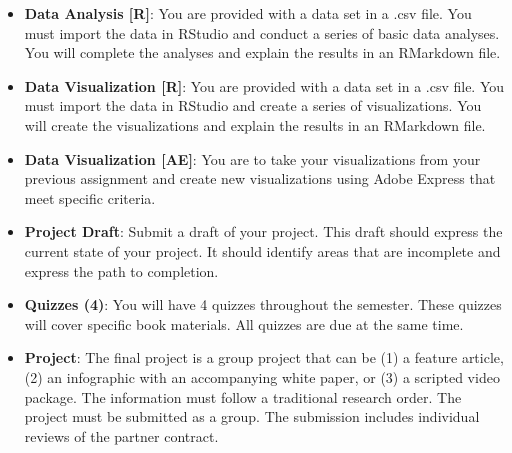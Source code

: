 \documentclass[
]{book}
\begin{document}
\begin{itemize}
\item
  \textbf{Data Analysis {[}R{]}}: You are provided with a data set in a .csv file. You must import the data in RStudio and conduct a series of basic data analyses. You will complete the analyses and explain the results in an RMarkdown file.
\item
  \textbf{Data Visualization {[}R{]}}: You are provided with a data set in a .csv file. You must import the data in RStudio and create a series of visualizations. You will create the visualizations and explain the results in an RMarkdown file.
\item
  \textbf{Data Visualization {[}AE{]}}: You are to take your visualizations from your previous assignment and create new visualizations using Adobe Express that meet specific criteria.
\item
  \textbf{Project Draft}: Submit a draft of your project. This draft should express the current state of your project. It should identify areas that are incomplete and express the path to completion.
\item
  \textbf{Quizzes (4)}: You will have 4 quizzes throughout the semester. These quizzes will cover specific book materials. All quizzes are due at the same time.
\item
  \textbf{Project}: The final project is a group project that can be (1) a feature article, (2) an infographic with an accompanying white paper, or (3) a scripted video package. The information must follow a traditional research order. The project must be submitted as a group. The submission includes individual reviews of the partner contract.
\end{itemize}

  
\end{document}
